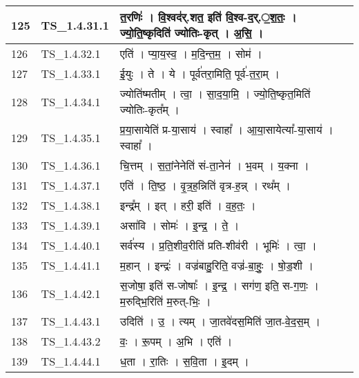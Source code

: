 \documentclass[17pt]{extarticle}
\begin{document}
\begin{longtable}{||p{0.4in}||p{0.9in}||p{4.0in}||p{0.9in}||}
        \hline
            125 & TS\_1.4.31.1 & त॒रणिः॑   ।   वि॒श्वद॑र्.शत॒ इति॑ वि॒श्व{-}द॒र्.॒श॒तः॒   ।   ज्यो॒ति॒ष्कृदिति॑ ज्योतिः{-}कृत्   ।   अ॒सि॒   ।    &      \\
        \hline
            126 & TS\_1.4.32.1 & एति॑   ।   प्या॒य॒स्व॒   ।   म॒दि॒न्त॒म॒   ।   सोम॑   ।    &      \\
        \hline
            127 & TS\_1.4.33.1 & ई॒युः   ।   ते   ।   ये   ।   पूर्व॑तरा॒मिति॒ पूर्व॑{-}त॒रा॒म्   ।    &      \\
        \hline
            128 & TS\_1.4.34.1 & ज्योति॑ष्मतीम्   ।   त्वा॒   ।   सा॒द॒या॒मि॒   ।   ज्यो॒ति॒ष्कृत॒मिति॑ ज्योतिः{-}कृत᳚म्   ।    &      \\
        \hline
            129 & TS\_1.4.35.1 & प्र॒या॒सायेति॑ प्र{-}या॒साय॑   ।   स्वाहा᳚   ।   आ॒या॒सायेत्या᳚{-}या॒साय॑   ।   स्वाहा᳚   ।    &      \\
        \hline
            130 & TS\_1.4.36.1 & चि॒त्तम्   ।   स॒तां॒नेनेति॑ सं{-}ता॒नेन॑   ।   भ॒वम्   ।   य॒क्ना   ।    &      \\
        \hline
            131 & TS\_1.4.37.1 & एति॑   ।   ति॒ष्ठ॒   ।   वृ॒त्र॒ह॒न्निति॑ वृत्र{-}ह॒न्न्   ।   रथ᳚म्   ।    &      \\
        \hline
            132 & TS\_1.4.38.1 & इन्द्र᳚म्   ।   इत्   ।   हरी॒ इति॑   ।   व॒ह॒तः॒   ।    &      \\
        \hline
            133 & TS\_1.4.39.1 & असा॑वि   ।   सोमः॑   ।   इ॒न्द्र॒   ।   ते॒   ।    &      \\
        \hline
            134 & TS\_1.4.40.1 & सर्व॑स्य   ।   प्र॒ति॒शीव॒रीति॑ प्रति{-}शीव॑री   ।   भूमिः॑   ।   त्वा॒   ।    &      \\
        \hline
            135 & TS\_1.4.41.1 & म॒हान्   ।   इन्द्रः॑   ।   वज्र॑बाहु॒रिति॒ वज्र॑{-}बा॒हुः॒   ।   षो॒ड॒शी   ।    &      \\
        \hline
            136 & TS\_1.4.42.1 & स॒जोषा॒ इति॑ स{-}जोषाः᳚   ।   इ॒न्द्र॒   ।   सग॑ण॒ इति॒ स{-}ग॒णः॒   ।   म॒रुद्भि॒रिति॑ म॒रुत्{-}भिः॒   ।    &      \\
        \hline
            137 & TS\_1.4.43.1 & उदिति॑   ।   उ॒   ।   त्यम्   ।   जा॒तवे॑दस॒मिति॑ जा॒त{-}वे॒द॒स॒म्   ।    &      \\
        \hline
            138 & TS\_1.4.43.2 & वः॒   ।   रू॒पम्   ।   अ॒भि   ।   एति॑   ।    &      \\
        \hline
            139 & TS\_1.4.44.1 & ध॒ता   ।   रा॒तिः   ।   स॒वि॒ता   ।   इ॒दम्   ।    &      \\
        \hline

\end{longtable}
\end{document}
